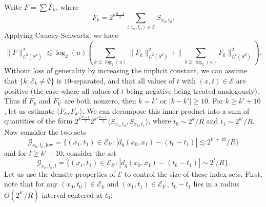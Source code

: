 \documentclass[dvipsnames,letterpaper,12pt]{article}
\begin{document}
Write $F = \sum F_k$, where
%
\[ F_k = 2^{k \frac{d-1}{2}} \sum_{(x_0,t_0) \in \mathcal{E}} {S\!}_{x_0,t_0}. \]
%
Applying Cauchy-Schwartz, we have
%
\[ \| F \|_{L^2(S^d)}^2 \lesssim \log_2(u) \left( \sum_{k \lesssim \log_2(u)} \| F_k \|_{L^2(S^d)}^2 + \| \sum_{k \gtrsim \log_2(u)} F_k \|_{L^2(S^d)}^2 \right). \]
%
Without loss of generality by increasing the implicit constant, we can assume that $\{ k : \mathcal{E}_k \neq \emptyset \}$ is $10$-separated, and that all values of $t$ with $(x,t) \in \mathcal{E}$ are positive (the case where all values of $t$ being negative being treated analogously). Thus if $F_k$ and $F_{k'}$ are both nonzero, then $k = k'$ or $|k - k'| \geq 10$. For $k \geq k' + 10$, let us estimate $\langle F_k, F_{k'} \rangle$. We can decompose this inner product into a sum of quantities of the form $2^{k \frac{d-1}{2}} 2^{k' \frac{d-1}{2}} \langle {S\!}_{x_0,t_0}, {S\!}_{x_1,t_1} \rangle$, where $t_0 \sim 2^k / R$ and $t_1 \sim 2^{k'} / R$. Now consider the two sets
%
\[ \mathcal{G}_{x_0,t_0,\text{low}} = \{ (x_1,t_1) \in \mathcal{E}_{k'} : |d_g(x_0,x_1) - (t_0 - t_1)| \lesssim 2^{k' + 10} / R \} \]
%
and for $l \geq k' + 10$, consider the set
%
\[ \mathcal{G}_{x_0,t_0,l} = \{ (x_1,t_1) \in \mathcal{E}_{k'} : |d_g(x_0,x_1) - (t_0 - t_1)| \sim 2^l / R \}. \]
%
Let us use the density properties of $\mathcal{E}$ to control the size of these index sets. First, note that for any $(x_0,t_0) \in \mathcal{E}_k$ and $(x_1,t_1) \in \mathcal{E}_{k'}$, $t_0 - t_1$ lies in a radius $O(2^{k'} / R)$ interval centered at $t_0$:
%
\end{document}
